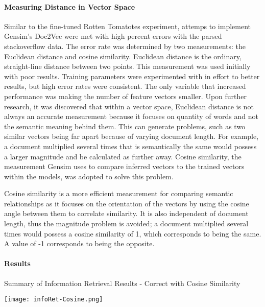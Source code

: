 \paragraph{Measuring Distance in Vector Space} Similar to the fine-tuned Rotten Tomatotes experiment, attemps to implement Gensim's Doc2Vec were met with high percent errors with the parsed stackoverflow data. The error rate was determined by two measurements: the Euclidean distance and cosine similarity. Euclidean distance is the ordinary, straight-line distance between two points. This measurement was used initially with poor results. Training parameters were experimented with in effort to better results, but high error rates were consistent. The only variable that increased performance was making the number of feature vectors smaller. Upon further research, it was discovered that within a vector space, Euclidean distance is not always an accurate measurement because it focuses on quantity of words and not the semantic meaning behind them. \cite{RefWorks:doc:5aa695dbe4b0e15a211a9ae7} This can generate problems, such as two similar vectors being far apart because of varying document length. For example, a document multiplied several times that is semantically the same would possess a larger magnitude and be calculated as further away. Cosine similarity, the measurement Gensim uses to compare inferred vectors to the trained vectors within the models, was adopted to solve this problem.

Cosine similarity is a more efficient measurement for comparing semantic relationships as it focuses on the orientation of the vectors by using the cosine angle between them to correlate similarity. \cite{RefWorks:doc:5aa695dbe4b0e15a211a9ae7} It is also independent of document length, thus the magnitude problem is avoided; a document multiplied several times would possess a cosine similarity of 1, which corresponds to being the same. A value of -1 corresponds to being the opposite. 

\paragraph{Results}

\begin{table}[ht]
\caption{Summary of Information Retrieval Results - Correct with Cosine Similarity}
\label{results_of_information_retrieval_cosine}
\centering
\texttt{[image: infoRet-Cosine.png]}
\end{table}

